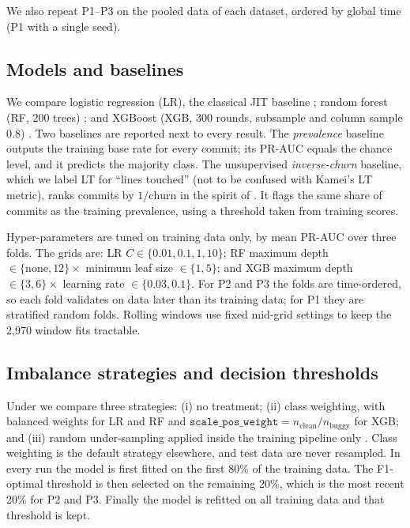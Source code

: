 We also repeat P1--P3 on the pooled data of each dataset, ordered by global time (P1 with a single seed).

\subsection{Models and baselines}\label{sec:models}

We compare logistic regression (LR), the classical JIT baseline \citep{kamei2013}; random forest (RF, 200 trees) \citep{breiman2001}; and XGBoost (XGB, 300 rounds, subsample and column sample 0.8) \citep{chen2016}. Two baselines are reported next to every result. The \emph{prevalence} baseline outputs the training base rate for every commit; its PR-AUC equals the chance level, and it predicts the majority class. The unsupervised \emph{inverse-churn} baseline, which we label LT for ``lines touched'' (not to be confused with Kamei's LT metric), ranks commits by $1/\text{churn}$ in the spirit of \citet{yang2016}. It flags the same share of commits as the training prevalence, using a threshold taken from training scores.

Hyper-parameters are tuned on training data only, by mean PR-AUC over three folds. The grids are: LR $C\in\{0.01,0.1,1,10\}$; RF maximum depth $\in\{\text{none},12\}\times$ minimum leaf size $\in\{1,5\}$; and XGB maximum depth $\in\{3,6\}\times$ learning rate $\in\{0.03,0.1\}$. For P2 and P3 the folds are time-ordered, so each fold validates on data later than its training data; for P1 they are stratified random folds. Rolling windows use fixed mid-grid settings to keep the 2{,}970 window fits tractable.

\subsection{Imbalance strategies and decision thresholds}\label{sec:imbalance}

Under \pthree{} we compare three strategies: (i) no treatment; (ii) class weighting, with balanced weights for LR and RF and $\texttt{scale\_pos\_weight}=n_{\text{clean}}/n_{\text{buggy}}$ for XGB; and (iii) random under-sampling applied inside the training pipeline only \citep{lemaitre2017}. Class weighting is the default strategy elsewhere, and test data are never resampled. In every run the model is first fitted on the first 80\% of the training data. The F1-optimal threshold is then selected on the remaining 20\%, which is the most recent 20\% for P2 and P3. Finally the model is refitted on all training data and that threshold is kept.

